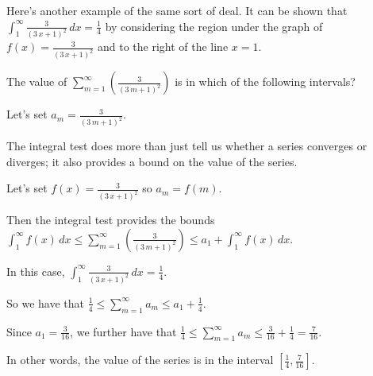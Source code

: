 \documentclass{ximera}
\begin{document}
\begin{question}
  Here's another example of the same sort of deal.  It can be shown that \(\displaystyle\int_{1}^\infty \displaystyle\frac{3}{{\left(3 \, x + 1\right)}^{2}} \, dx = \displaystyle\frac{1}{4}\) by considering the region under the graph of \(\displaystyle f(x) = \displaystyle\frac{3}{{\left(3 \, x + 1\right)}^{2}}\) and to the right of the line \(x = 1\).

  The value of \(\displaystyle\sum_{m=1}^\infty \left( \displaystyle\frac{3}{{\left(3 \, m + 1\right)}^{2}} \right)\) is in which of the following intervals?

  \begin{solution}
    \begin{hint}
      Let's set \(a_m = \displaystyle\frac{3}{{\left(3 \, m + 1\right)}^{2}}\).
    \end{hint}
    \begin{hint}
      The integral test does more than just tell us whether a series converges or diverges; it also provides a bound on the value of the series.
    \end{hint}
    \begin{hint}
      Let's set \(f(x) = \displaystyle\frac{3}{{\left(3 \, x + 1\right)}^{2}}\) so \(a_m = f(m)\).
    \end{hint}
    \begin{hint}
      Then the integral test provides the bounds \(\displaystyle\int_{1}^\infty f(x) \, dx \leq \displaystyle\sum_{m=1}^\infty \left( \displaystyle\frac{3}{{\left(3 \, m + 1\right)}^{2}} \right) \leq a_{1} + \displaystyle\int_{1}^\infty f(x) \, dx\).
    \end{hint}
    \begin{hint}
      In this case, \(\displaystyle\int_{1}^\infty \displaystyle\frac{3}{{\left(3 \, x + 1\right)}^{2}} \, dx = \displaystyle\frac{1}{4}\).
    \end{hint}
    \begin{hint}
      So we have that \(\displaystyle\frac{1}{4} \leq \displaystyle\sum_{m=1}^\infty a_{m} \leq a_{1} + \displaystyle\frac{1}{4}\).
    \end{hint}
    \begin{hint}
      Since \(a_{1} = \displaystyle\frac{3}{16}\), we further have that \(\displaystyle\frac{1}{4} \leq \displaystyle\sum_{m=1}^\infty a_{m} \leq \displaystyle\frac{3}{16} + \displaystyle\frac{1}{4} = \displaystyle\frac{7}{16}\).
    \end{hint}
    \begin{hint}
      In other words, the value of the series is in the interval \(\left[\displaystyle\frac{1}{4}, \displaystyle\frac{7}{16}\right]\).
      
    \end{hint}
    
    \begin{multiple-choice}
      \choice[correct]{[1/4, 7/16]}
      \choice{[1/16, 1/4]}
      \choice{[3/16, 1/4]}
      \choice{[7/16, 5/8]}
    \end{multiple-choice}
    
  \end{solution}
\end{question}
\end{document}
